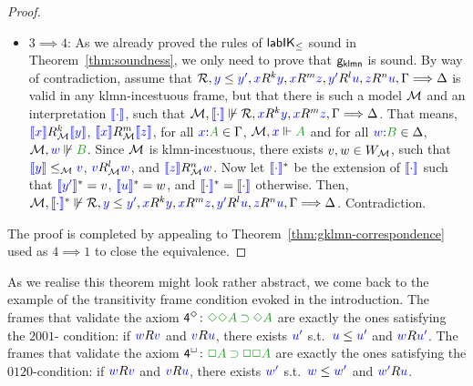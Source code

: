 \documentclass[a4paper]{article}
\begin{document}
\begin{proof}
\begin{itemize}
		\item $3 \implies 4$:
		As we already proved the rules of $\labIKp$ sound in Theorem~\ref{thm:soundness}, we only need to prove that $\gklmn$ is sound.
		By way of contradiction, assume that $\B, \futs{y}{y'}, \lb x R^{k} \lb y, \lb x R^{m} \lb z, \lb{y'}R^{l} \lb u, \lb z R^{n} \lb u, \Left\SEQ\Right$ is valid in any klmn-incestuous frame,
		but that there is such a model $\M$ and an interpretation $\inter\cdot$, such
		that $\M,\inter\cdot\not\Vdash\B, \lb x R^{k} \lb y, \lb x R^{m} \lb z, \Left \SEQ \Right$.
		That means, $\inter x \rel_\M^k \inter y$, $\inter x \rel_\M^m\inter z$, for all $\labels{x}{A} \in \Left$, $\cforce \M xA$ and for all $\labels wB\in\Right$,
		$\cnforce \M wB$. 
		Since $\M$ is klmn-incestuous, there exists $v,w\in W_\M$, such that $\inter y \le_\M \lb{v}$, $\lb{v} R_\M^l \lb{w}$, and $\inter z R_\M^n \lb{w}$.
		Now let $\inter\cdot^*$ be the extension of $\inter\cdot$ such that $\inter{y'}^* = v$, $\inter{u}^* = w$, and $\inter\cdot^* = \inter\cdot$ otherwise.
		Then, $ \nforce \M {\inter\cdot^*} {\B, \futs{y}{y'}, \lb x R^{k} \lb y, \lb x R^{m} \lb z, \lb{y'}R^{l} \lb u, \lb z R^{n} \lb u, \Left\SEQ\Right}$. Contradiction.
	\end{itemize}
	
	The proof is completed by appealing to Theorem~\ref{thm:gklmn-correspondence} used as $4 \implies 1$ to close the equivalence.
\end{proof}

%

As we realise this theorem might look rather abstract, we come back to the example of the transitivity frame condition evoked in the introduction.
The frames that validate the axiom $\ax{4^{\DIA}} \colon \fm{\DIA\DIA A \IMP \DIA A}$ are exactly the ones satisfying the $2001$- condition: if $\accs wv$ and $\accs vu$, there exists $\lb{u'}$ s.t.~$\futs{u}{u'}$ and $\accs{w}{u'}$.
The frames that validate the axiom $\ax{4^{\BOX}} \colon \fm{\BOX A \IMP \BOX \BOX A}$ are exactly the ones satisfying the $0120$-condition: if $\accs wv$ and $\accs vu$, there exists $\lb{w'}$ s.t.~$\futs{w}{w'}$ and $\accs{w'}{u}$.
\end{document}
